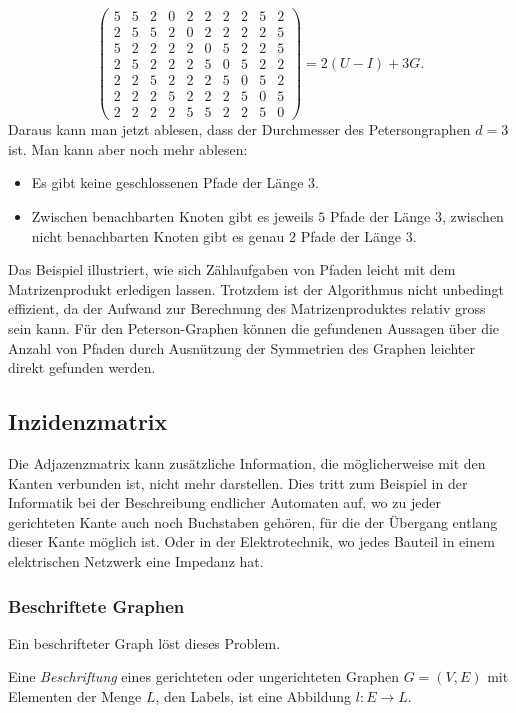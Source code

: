 \begin{beispiel}
\[\begin{pmatrix}
 5& 5& 2& 0& 2& 2& 2& 2& 5& 2\\
 2& 5& 5& 2& 0& 2& 2& 2& 2& 5\\
 5& 2& 2& 2& 2& 0& 5& 2& 2& 5\\
 2& 5& 2& 2& 2& 5& 0& 5& 2& 2\\
 2& 2& 5& 2& 2& 2& 5& 0& 5& 2\\
 2& 2& 2& 5& 2& 2& 2& 5& 0& 5\\
 2& 2& 2& 2& 5& 5& 2& 2& 5& 0
\end{pmatrix}
=
2(U-I) + 3G.
\]
Daraus kann man jetzt ablesen, dass der Durchmesser des Petersongraphen
$d=3$ ist.
Man kann aber noch mehr ablesen:
\begin{itemize}
\item
Es gibt keine geschlossenen Pfade der Länge $3$.
\item
Zwischen benachbarten Knoten gibt es jeweils $5$ Pfade der Länge $3$,
zwischen nicht benachbarten Knoten gibt es genau $2$ Pfade der Länge $3$.
\qedhere
\end{itemize}
\end{beispiel}

Das Beispiel illustriert, wie sich Zählaufgaben von Pfaden leicht mit dem
Matrizenprodukt erledigen lassen.
Trotzdem ist der Algorithmus nicht unbedingt effizient, da der Aufwand
zur Berechnung des Matrizenproduktes relativ gross sein kann.
Für den Peterson-Graphen können die gefundenen Aussagen über die Anzahl
von Pfaden durch Ausnützung der Symmetrien des Graphen leichter direkt
gefunden werden.


\subsection{Inzidenzmatrix}
Die Adjazenzmatrix kann zusätzliche Information, die möglicherweise
mit den Kanten verbunden ist, nicht mehr darstellen.
Dies tritt zum Beispiel in der Informatik bei der Beschreibung
endlicher Automaten auf, wo zu jeder gerichteten Kante auch noch
Buchstaben gehören, für die der Übergang entlang dieser Kante
möglich ist.
Oder in der Elektrotechnik, wo jedes Bauteil in einem elektrischen
Netzwerk eine Impedanz hat.

\subsubsection{Beschriftete Graphen}
Ein beschrifteter Graph löst dieses Problem.

\begin{definition}
Eine {\em Beschriftung}
eines gerichteten oder ungerichteten Graphen $G=(V,E)$ 
mit Elementen der Menge $L$, den Labels,
ist eine Abbildung $l\colon E\to L$.
%
\end{definition}

